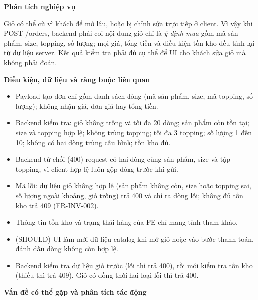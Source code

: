 \documentclass[11pt,a4paper,oneside]{report}
\begin{document}
\textbf{Phân tích nghiệp vụ}

Giỏ có thể cũ vì khách để mở lâu, hoặc bị chỉnh sửa trực tiếp ở client. Vì vậy khi POST /orders, backend phải coi nội dung giỏ chỉ là \emph{ý định mua} gồm mã sản phẩm, size, topping, số lượng; mọi giá, tổng tiền và điều kiện tồn kho đều tính lại từ dữ liệu server. Kết quả kiểm tra phải đủ cụ thể để UI cho khách sửa giỏ mà không phải đoán.

\textbf{Điều kiện, dữ liệu và ràng buộc liên quan}

\begin{itemize}
\item
  Payload tạo đơn chỉ gồm danh sách dòng (mã sản phẩm, size, mã topping, số lượng); không nhận giá, đơn giá hay tổng tiền.
\item
  Backend kiểm tra: giỏ không trống và tối đa 20 dòng; sản phẩm còn tồn tại; size và topping hợp lệ; không trùng topping; tối đa 3 topping; số lượng 1 đến 10; không có hai dòng trùng cấu hình; tồn kho đủ.
\item
  Backend từ chối (400) request có hai dòng cùng sản phẩm, size và tập topping, vì client hợp lệ luôn gộp dòng trước khi gửi.
\item
  Mã lỗi: dữ liệu giỏ không hợp lệ (sản phẩm không còn, size hoặc topping sai, số lượng ngoài khoảng, giỏ trống) trả 400 và chỉ ra dòng lỗi; không đủ tồn kho trả 409 (FR-INV-002).
\item
  Thông tin tồn kho và trạng thái hàng của FE chỉ mang tính tham khảo.
\item
  (SHOULD) UI làm mới dữ liệu catalog khi mở giỏ hoặc vào bước thanh toán, đánh dấu dòng không còn hợp lệ.
\item
  Backend kiểm tra dữ liệu giỏ trước (lỗi thì trả 400), rồi mới kiểm tra tồn kho (thiếu thì trả 409). Giỏ có đồng thời hai loại lỗi thì trả 400.
\end{itemize}

\textbf{Vấn đề có thể gặp và phân tích tác động}
\end{document}

